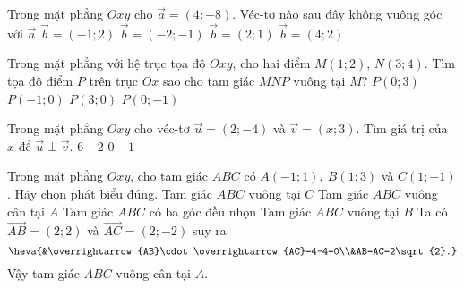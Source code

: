 \begin{ex}%
	Trong mặt phẳng $Oxy$ cho $\overrightarrow{a}=(4;-8).$ Véc-tơ nào sau đây không vuông góc với $\overrightarrow{a}$ 
	\choice
	{\True $\overrightarrow{b}=(-1;2)$}
	{$\overrightarrow{b}=(-2;-1)$}
	{$\overrightarrow{b}=(2;1)$}
	{$\overrightarrow{b}=(4;2)$}
\end{ex}

\begin{ex}%
	Trong mặt phẳng với hệ trục tọa độ $Oxy$, cho hai điểm $M(1;2)$, $N(3;4)$. Tìm tọa độ điểm $P$ trên
	trục $Ox$ sao cho tam giác $MNP$ vuông tại $M$?
	\choice
	{$P(0;3)$}
	{$P(-1;0)$}
	{\True $P(3;0)$}
	{$P(0;-1)$}
\end{ex}

\begin{ex}%
	Trong mặt phẳng $Oxy$ cho véc-tơ $\overrightarrow{u}=(2;-4)$ và $\overrightarrow{v}=(x;3)$. Tìm giá trị của $x$ để $\overrightarrow{u}\perp \overrightarrow{v}$.
	\choice
	{\True $6$}
	{$-2$}
	{$0$}
	{$-1$}
\end{ex}

\begin{ex}%
	Trong mặt phẳng $Oxy$, cho tam giác $ABC$ có $A(-1;1),~B(1;3)$ và $C(1;-1)$. Hãy chọn phát biểu đúng.
	\choice
	{Tam giác $ABC$ vuông tại $C$}
	{\True Tam giác $ABC$ vuông cân tại $A$}
	{Tam giác $ABC$ có ba góc đều nhọn}
	{Tam giác $ABC$ vuông tại $B$}
	\loigiai
	{
		Ta có $\overrightarrow{AB}=(2;2)$ và $\overrightarrow{AC}=(2;-2)$ suy ra
		\[\heva{&\overrightarrow{AB}\cdot\overrightarrow{AC}=4-4=0\\&AB=AC=2\sqrt{2}.}\]
		Vậy tam giác $ABC$ vuông cân tại $A$.
	}
\end{ex}


